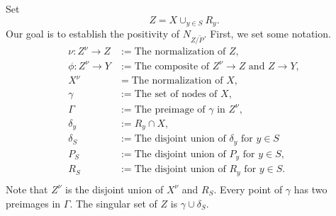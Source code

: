 \documentclass[11 pt]{amsart}
\providecommand {\from}{{\colon}}
\numberwithin{equation}{section}
\begin{document}
Set \[Z = X \cup_{y \in S} R_y.\]
Our goal is to establish the positivity of $N_{Z/\widetilde{P}}$.
First, we set some notation.
\begin{align*}
  \nu \from Z^\nu \to Z &:= \text{The normalization of $Z$},\\
  \phi \from Z^\nu \to Y &:= \text{The composite of $Z^\nu \to Z$ and $Z \to Y$},\\
  X^\nu &= \text{The normalization of $X$},\\
  \gamma &:= \text{The set of nodes of $X$},\\
  \Gamma &:= \text{The preimage of $\gamma$ in $Z^\nu$},\\
  \delta_y &:= R_y \cap X,\\
  \delta_S &:= \text{The disjoint union of $\delta_y$ for $y \in S$}\\
  P_S &:= \text{The disjoint union of $P_y$ for $y \in S$},\\
  R_S &:= \text{The disjoint union of $R_y$ for $y \in S$}.\\
\end{align*}
Note that $Z^\nu$ is the disjoint union of $X^\nu$ and $R_S$.
Every point of $\gamma$ has two preimages in $\Gamma$.
The singular set of $Z$ is $\gamma \cup \delta_S$.
\end{document}
